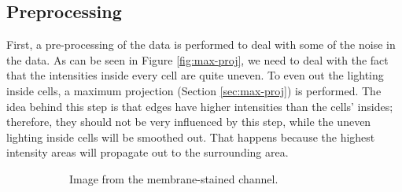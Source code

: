 \documentclass[
  digital,     %
  oneside,     %
  nosansbold,  %
  nocolorbold, %
  lof,         %
  lot,         %
]{fithesis4}
\begin{document}
\subsection{Preprocessing}
First, a pre-processing of the data is performed to deal with some of the noise in
the data. As can be seen in Figure \ref{fig:max-proj}, we need to deal with the
fact that the intensities inside every cell are quite uneven. To even out the
lighting inside cells, a maximum projection (Section \ref{sec:max-proj}) is
performed. The idea behind this step is that edges have higher intensities than
the cells' insides; therefore, they should not be very influenced by this step,
while the uneven lighting inside cells will be smoothed out. That happens
because the highest intensity areas will propagate out to the surrounding area.

\begin{figure}
    \begin{subfigure}[t]{0.45\textwidth}
        \centering
        \caption{Image from the membrane-stained channel.}
    \end{subfigure}
    \begin{subfigure}[t]{0.45\linewidth}
        \centering

\end{subfigure}
\end{figure}
\end{document}
